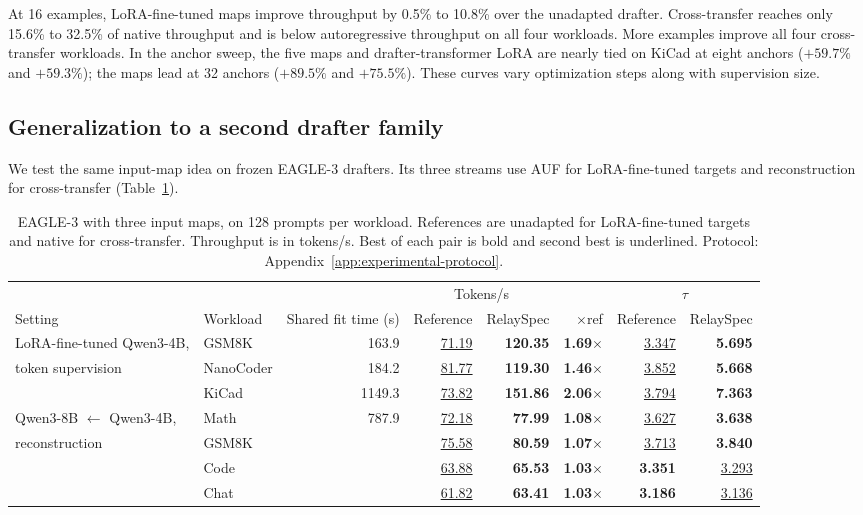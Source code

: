

At 16 examples, LoRA-fine-tuned maps improve throughput by 0.5\% to 10.8\% over the unadapted drafter. Cross-transfer reaches only 15.6\% to 32.5\% of native throughput and is below autoregressive throughput on all four workloads. More examples improve all four cross-transfer workloads. In the anchor sweep, the five maps and drafter-transformer LoRA are nearly tied on KiCad at eight anchors ($+59.7\%$ and $+59.3\%$); the maps lead at 32 anchors ($+89.5\%$ and $+75.5\%$). These curves vary optimization steps along with supervision size.

\subsection{Generalization to a second drafter family}
\label{sec:eagle}
We test the same input-map idea on frozen EAGLE-3 drafters. Its three streams use AUF for LoRA-fine-tuned targets and reconstruction for cross-transfer (Table~\ref{tab:eagle}).

\begin{table}[t]
\centering
\caption{EAGLE-3 with three input maps, on 128 prompts per workload. References are unadapted for LoRA-fine-tuned targets and native for cross-transfer. Throughput is in tokens/s. Best of each pair is bold and second best is underlined. Protocol: Appendix~\ref{app:experimental-protocol}.}
\label{tab:eagle}
\scriptsize
\setlength{\tabcolsep}{3.3pt}
\begin{tabular}{llrrrrrr}
\toprule
& & & \multicolumn{2}{c}{Tokens/s} & & \multicolumn{2}{c}{$\tau$} \\
\cmidrule(lr){4-5}\cmidrule(lr){7-8}
Setting & Workload & Shared fit time (s) & Reference & RelaySpec & $\times$ref & Reference & RelaySpec \\
\midrule
LoRA-fine-tuned Qwen3-4B, & GSM8K & 163.9 & \underline{71.19} & \textbf{120.35} & \textbf{1.69$\times$} & \underline{3.347} & \textbf{5.695} \\
token supervision & NanoCoder & 184.2 & \underline{81.77} & \textbf{119.30} & \textbf{1.46$\times$} & \underline{3.852} & \textbf{5.668} \\
 & KiCad & 1149.3 & \underline{73.82} & \textbf{151.86} & \textbf{2.06$\times$} & \underline{3.794} & \textbf{7.363} \\
\midrule
Qwen3-8B $\leftarrow$ Qwen3-4B, & Math & \multirow{4}{*}{787.9} & \underline{72.18} & \textbf{77.99} & \textbf{1.08$\times$} & \underline{3.627} & \textbf{3.638} \\
reconstruction & GSM8K & & \underline{75.58} & \textbf{80.59} & \textbf{1.07$\times$} & \underline{3.713} & \textbf{3.840} \\
 & Code & & \underline{63.88} & \textbf{65.53} & \textbf{1.03$\times$} & \textbf{3.351} & \underline{3.293} \\
 & Chat & & \underline{61.82} & \textbf{63.41} & \textbf{1.03$\times$} & \textbf{3.186} & \underline{3.136} \\
\bottomrule
\end{tabular}
\end{table}

